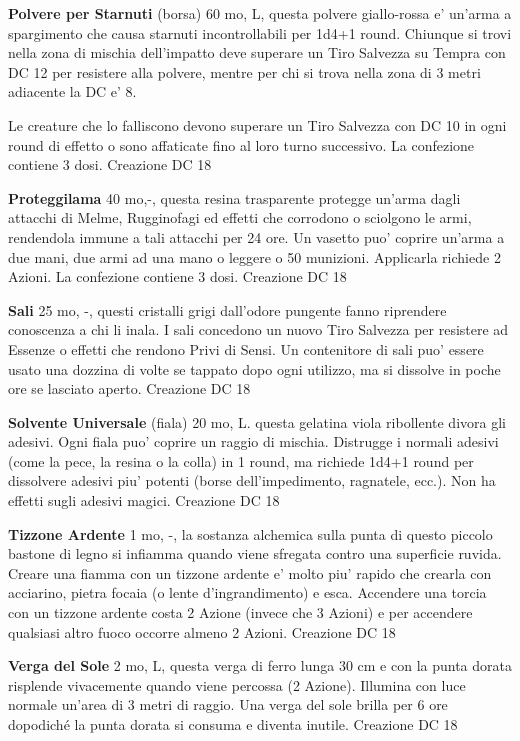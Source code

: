 \documentclass[a4paper,11pt,twoside,openany]{book}
\begin{document}
{		\textbf{Polvere per Starnuti} (borsa) 60 mo, L, questa polvere giallo-rossa e' un'arma a spargimento che causa starnuti incontrollabili per 1d4+1 round. Chiunque si trovi nella zona di mischia dell'impatto deve superare un Tiro Salvezza su Tempra con DC 12 per resistere alla polvere, mentre per chi si trova nella zona di 3 metri adiacente la DC e' 8.
		
		Le creature che lo falliscono devono superare un Tiro Salvezza con DC 10 in ogni round di effetto o sono affaticate fino al loro turno successivo. La confezione contiene 3 dosi. Creazione DC 18
		
		\textbf{Proteggilama} 40 mo,-, questa resina trasparente protegge un'arma dagli attacchi di Melme, Rugginofagi ed effetti che corrodono o sciolgono le armi, rendendola immune a tali attacchi per 24 ore. Un vasetto puo' coprire un'arma a due mani, due armi ad una mano o leggere o 50 munizioni. Applicarla richiede 2 Azioni. La confezione contiene 3 dosi. Creazione DC 18
		
		\textbf{Sali} 25 mo, -,  questi cristalli grigi dall'odore pungente fanno riprendere conoscenza a chi li inala. I sali concedono un nuovo Tiro Salvezza per resistere ad Essenze o effetti che rendono Privi di Sensi.
		Un contenitore di sali puo' essere usato una dozzina di volte se tappato dopo ogni utilizzo, ma si dissolve in poche ore se lasciato aperto. Creazione DC 18
		
		\textbf{Solvente Universale} (fiala) 20 mo, L. questa gelatina viola ribollente divora gli adesivi. Ogni fiala puo' coprire un raggio di mischia. Distrugge i normali adesivi (come la pece, la resina o la colla) in 1 round, ma richiede 1d4+1 round per dissolvere adesivi piu' potenti (borse dell'impedimento, ragnatele, ecc.). Non ha effetti sugli adesivi magici. Creazione DC 18
		
		\textbf{Tizzone Ardente} 1 mo, -, la sostanza alchemica sulla punta di questo piccolo bastone di legno si infiamma quando viene sfregata contro una superficie ruvida. Creare una fiamma con un tizzone ardente e' molto piu' rapido che crearla con acciarino, pietra focaia (o lente d'ingrandimento) e esca. Accendere una torcia con un tizzone ardente costa 2 Azione (invece che 3 Azioni) e per accendere qualsiasi altro fuoco occorre almeno 2 Azioni. Creazione DC 18
		
		\textbf{Verga del Sole} 2 mo, L, questa verga di ferro lunga 30 cm e con la punta dorata risplende vivacemente quando viene percossa (2 Azione). Illumina con luce normale un'area di 3 metri di raggio. Una verga del sole brilla per 6 ore dopodiché la punta dorata si consuma e diventa inutile. Creazione DC 18
		
}
\end{document}
